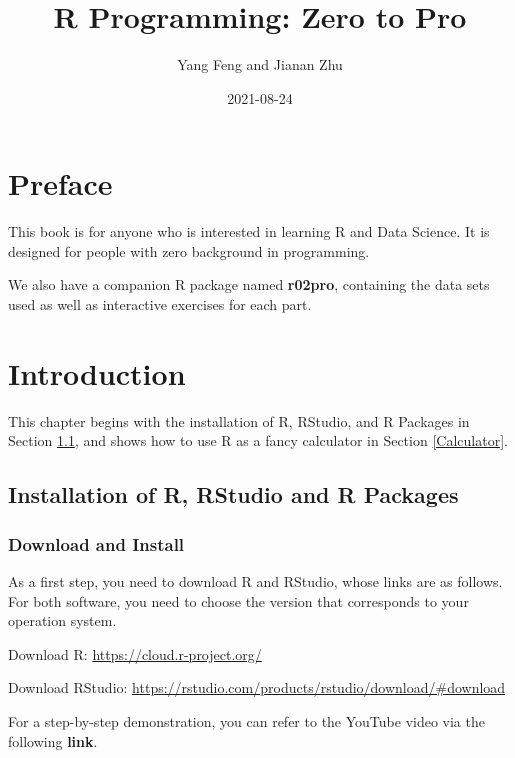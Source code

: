 \documentclass[
]{book}
\title{R Programming: Zero to Pro}
\author{Yang Feng and Jianan Zhu}
\date{2021-08-24}
\newenvironment{infobox}[1]
  {
  \begin{itemize}
  \renewcommand{\labelitemi}{
    \raisebox{-.7\height}[0pt][0pt]{
      {\setkeys{Gin}{width=3em,keepaspectratio}
        \texttt{[image: pics/\#1]}}
    }
  }
  \setlength{\fboxsep}{1em}
  \begin{blackbox}
  \item
  }
  {
  \end{blackbox}
  \end{itemize}
  }
\newenvironment{blackbox}{
  \definecolor{shadecolor}{rgb}{0, 0, 0}  %
  \color{white}
  \begin{shaded}}
 {\end{shaded}}
\begin{document}
\maketitle

{
\setcounter{tocdepth}{1}
\tableofcontents
}
\hypertarget{preface}{%
\chapter*{Preface}\label{preface}}

This book is for anyone who is interested in learning R and Data Science. It is designed for people with zero background in programming.

We also have a companion R package named \textbf{r02pro}, containing the data sets used as well as interactive exercises for each part.

\hypertarget{introduction}{%
\chapter{Introduction}\label{introduction}}

This chapter begins with the installation of R, RStudio, and R Packages in Section \ref{Installation}, and shows how to use R as a fancy calculator in Section \ref{Calculator}.

\hypertarget{Installation}{%
\section{Installation of R, RStudio and R Packages}\label{Installation}}

\hypertarget{download-and-install}{%
\subsection{Download and Install}\label{download-and-install}}

As a first step, you need to download R and RStudio, whose links are as follows. For both software, you need to choose the version that corresponds to your operation system.

Download R: \url{https://cloud.r-project.org/}

Download RStudio: \url{https://rstudio.com/products/rstudio/download/\#download}

\begin{infobox}{caution}
For a step-by-step demonstration, you can refer to the YouTube video via the following \textbf{link}.

\end{infobox}
\end{document}

